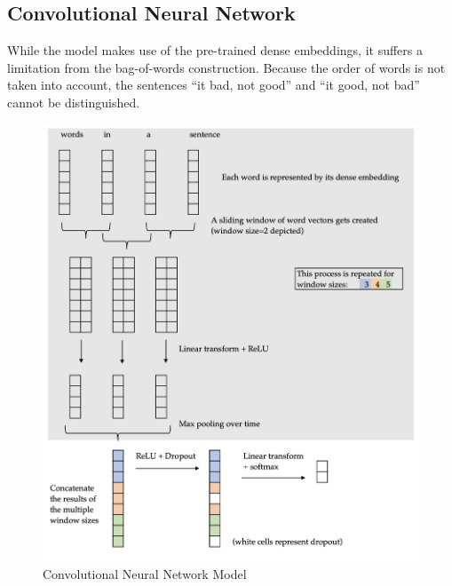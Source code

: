 \documentclass[11pt]{article}
\begin{document}
\subsection{Convolutional Neural Network}
\label{subsec:convnet}

While the  model makes use of the pre-trained dense
embeddings, it suffers a limitation from the bag-of-words construction. Because
the order of words is not taken into account, the sentences ``it bad, not good''
and ``it good, not bad'' cannot be distinguished. 

\begin{figure}[htb]
\centering
\includegraphics[width=\textwidth]{figs/convnet.png}
\caption{Convolutional Neural Network Model}
\label{fig:convnet}
\end{figure}
\end{document}
